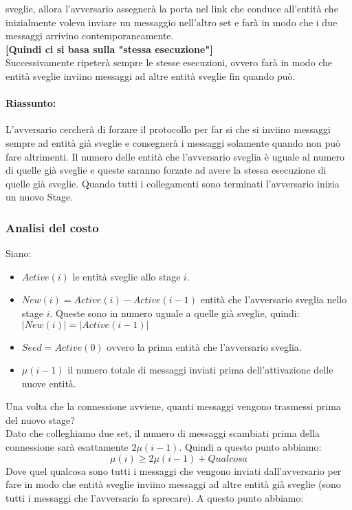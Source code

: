\begin{enumerate}
\begin{enumerate}
                    sveglie, allora l'avversario assegnerà la porta nel link che
                    conduce all'entità che inizialmente voleva inviare un
                    messaggio nell'altro set e farà in modo che i due messaggi
                    arrivino contemporaneamente. \\\textbf{[Quindi ci si basa
                                sulla "stessa esecuzione"]}\\
                    Successivamente ripeterà sempre le stesse esecuzioni, ovvero
                    farà in modo che entità sveglie inviino messaggi ad altre
                    entità sveglie fin quando può.
          \end{enumerate}
\end{enumerate}

\paragraph{Riassunto:} L'avversario cercherà di forzare il protocollo per far si
che si inviino messaggi sempre ad entità già sveglie e consegnerà i messaggi
solamente quando non può fare altrimenti. Il numero delle entità che
l'avversario sveglia è uguale al numero di quelle già sveglie e queste saranno
forzate ad avere la stessa esecuzione di quelle già sveglie. Quando tutti i
collegamenti sono terminati l'avversario inizia un nuovo Stage.

\subsubsection{Analisi del costo}
Siano:
\begin{itemize}
    \item $Active(i)$ le entità sveglie allo stage $i$.
    \item $New(i) = Active(i) - Active(i-1)$  entità che l'avversario sveglia
          nello stage $i$. Queste sono in numero uguale a quelle già sveglie, quindi:
          $|New(i)|=|Active(i-1)|$
    \item $Seed = Active(0)$ ovvero la prima entità che l'avversario sveglia.
    \item $\mu(i-1)$ il numero totale di messaggi inviati prima dell'attivazione
          delle nuove entità.%
\end{itemize}
Una volta che la connessione avviene, quanti messaggi vengono trasmessi prima
del nuovo stage?\\
Dato che colleghiamo due set, il numero di messaggi scambiati prima della
connessione sarà esattamente $2\mu(i-1)$. Quindi a questo punto abbiamo:
$$\mu(i) \geq 2\mu(i-1) + Qualcosa$$ Dove quel qualcosa sono tutti i messaggi
che vengono inviati dall'avversario per fare in modo che entità sveglie inviino
messaggi ad altre entità già sveglie (sono tutti i messaggi che l'avversario fa
sprecare). A questo punto abbiamo:

